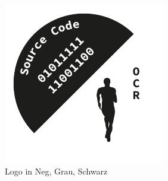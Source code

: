 \begin{figure}[!h]
\begin{minipage}[b]{0.30\textwidth}
		\end{minipage}
		\hfill
		\begin{minipage}[b]{0.20\textwidth}
			\includegraphics[width=\textwidth]{images/Logo/Logo-SW}%
		\end{minipage}
		\caption{Logo in Neg, Grau, Schwarz}\label{fig:logoneggrauschwarz}%
	\end{figure}

\clearpage
